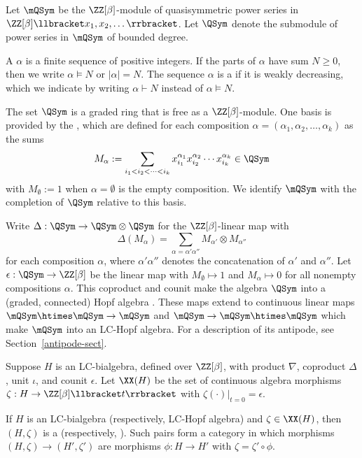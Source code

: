 \begin{definition}
Let $\mQSym$ be the $\ZZ[\beta]$-module of
quasisymmetric power series in $\ZZ[\beta]\llbracket x_1,x_2,\dots\rrbracket $.
Let $\QSym$ denote the submodule of power series in $\mQSym$ of bounded degree.
\end{definition}

A  $\alpha$ is a finite sequence of positive integers.
If the parts of $\alpha$ have sum $N \geq 0$, then we write $\alpha\vDash N$ or $|\alpha|=N$.
The sequence $\alpha$ is a  if it is weakly decreasing, which we indicate by writing $\alpha\vdash N$ instead of $\alpha \vDash N$.

The set $\QSym$ is a graded ring that is free as a $\ZZ[\beta]$-module.
One basis is provided by the
 , which are
defined for each composition $\alpha = (\alpha_1,\alpha_2,\dots,\alpha_k)$
as the sums
\[
M_\alpha := \sum_{i_1<i_2<\dots<i_k} x_{i_1}^{\alpha_1} x_{i_2}^{\alpha_2}\cdots x_{i_k}^{\alpha_k} \in \QSym
\] with 
 $M_\emptyset := 1$
when $\alpha =\emptyset$ is the empty composition.
We identify $\mQSym$ with the completion of $\QSym$ relative to this basis.




 Write $\Delta : \QSym \to \QSym \otimes \QSym$ for the $\ZZ[\beta]$-linear map with 
\[
\Delta(M_\alpha) = \sum_{\alpha =\alpha'\alpha''} M_{\alpha'} \otimes M_{\alpha''}
\]
for each composition $\alpha$,
where $\alpha'\alpha''$ denotes the concatenation of   $\alpha'$ and $\alpha''$.
Let $\epsilon : \QSym \to \ZZ[\beta]$ be the linear map with $M_\emptyset \mapsto 1$ and $M_\alpha\mapsto 0$
for all nonempty compositions $\alpha$.
This coproduct and counit make the algebra
 $\QSym$ into a (graded, connected) Hopf algebra \cite[\S5.1]{GrinbergReiner}.
These maps extend to continuous linear maps $\mQSym \htimes \mQSym \to\mQSym$
and
$\mQSym \to \mQSym \htimes \mQSym$ which make $\mQSym$ into an LC-Hopf algebra.
For a description of its antipode, see Section~\ref{antipode-sect}.

Suppose $H $
is an LC-bialgebra, defined over $\ZZ[\beta]$,
with product $\nabla$, coproduct $\Delta$, unit $\iota$, and counit $\epsilon$.
Let $\XX(H)$ be the set of continuous algebra morphisms $\zeta : H \to \ZZ[\beta]\llbracket t\rrbracket $
with $\zeta(\cdot )|_{t=0}=\epsilon$.



\begin{definition}
If $H$ is an LC-bialgebra (respectively, LC-Hopf algebra)
and $\zeta \in \XX(H)$, then  $(H,\zeta)$
is a  (respectively, ).
Such pairs form a category in which morphisms $(H,\zeta) \to (H',\zeta')$
are morphisms $\phi : H \to H'$ with $\zeta = \zeta'\circ \phi$.
\end{definition}



